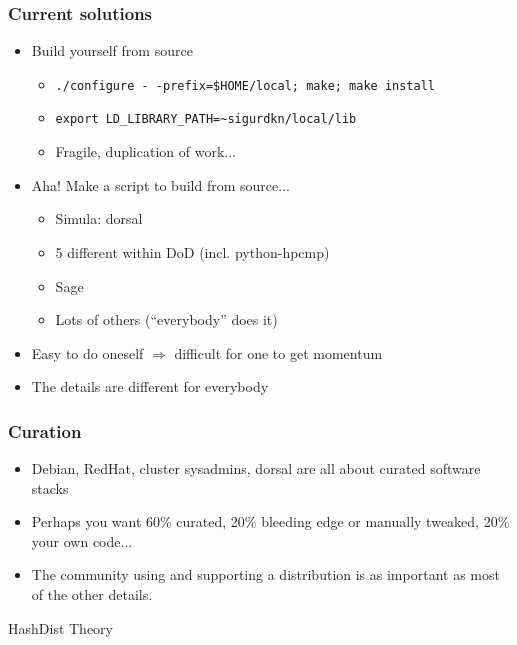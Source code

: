 \documentclass[sans,mathserif]{beamer}
\begin{document}
\begin{frame}
  \frametitle{Current solutions}
  \begin{itemize}
  \item<+-> Build yourself from source
    \begin{itemize}
    \item<+-> {\tt ./configure -\,{}-prefix=\$HOME/local; make; make install}
    \item<+-> {\tt export LD\_LIBRARY\_PATH=\textasciitilde{}sigurdkn/local/lib}
    \item<+-> Fragile, duplication of work...
    \end{itemize}
  \item<+-> Aha! Make a script to build from source...
    \begin{itemize}
    \item Simula: dorsal
    \item 5 different within DoD (incl. python-hpcmp)
    \item Sage
    \item Lots of others (``everybody'' does it)
    \end{itemize}
  \item<+-> Easy to do oneself $\Rightarrow$ difficult for one to get
    momentum
  \item<+-> The details are different for everybody
  \end{itemize}

\end{frame}


\begin{frame}
  \frametitle{Curation}
  
  \begin{itemize}
  \item<+-> Debian, RedHat, cluster sysadmins, dorsal are all about curated software stacks
  \item<+-> Perhaps you want 60\% curated, 20\% bleeding edge or manually tweaked, 20\% your own code...
  \item<+-> The community using and supporting a distribution is as important as most of the other details. 
  \end{itemize}
\end{frame}

\begin{frame}
  \begin{center}
    {\Large HashDist Theory}
  \end{center}
\end{frame}
\end{document}
